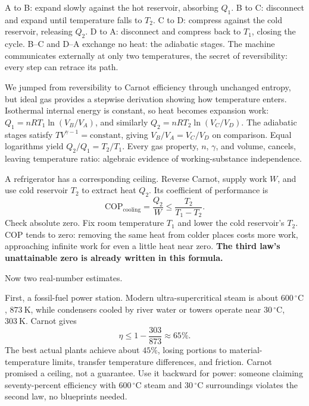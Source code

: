 A to B: expand slowly against the hot reservoir, absorbing \(Q_1\). B to C: disconnect and expand until temperature falls to \(T_2\). C to D: compress against the cold reservoir, releasing \(Q_2\). D to A: disconnect and compress back to \(T_1\), closing the cycle. B--C and D--A exchange no heat: the adiabatic stages. The machine communicates externally at only two temperatures, the secret of reversibility: every step can retrace its path.

\begin{mathbridge}
We jumped from reversibility to Carnot efficiency through unchanged entropy, but ideal gas provides a stepwise derivation showing how temperature enters. Isothermal internal energy is constant, so heat becomes expansion work: \(Q_1=nRT_1\ln(V_B/V_A)\), and similarly \(Q_2=nRT_2\ln(V_C/V_D)\). The adiabatic stages satisfy \(T V^{\gamma-1}=\text{constant}\), giving \(V_B/V_A=V_C/V_D\) on comparison. Equal logarithms yield \(Q_2/Q_1=T_2/T_1\). Every gas property, \(n\), \(\gamma\), and volume, cancels, leaving temperature ratio: algebraic evidence of working-substance independence.

A refrigerator has a corresponding ceiling. Reverse Carnot, supply work \(W\), and use cold reservoir \(T_2\) to extract heat \(Q_2\). Its coefficient of performance is
\[
\mathrm{COP}_{\text{cooling}}=\frac{Q_2}{W}\leq\frac{T_2}{T_1-T_2}.
\]
Check absolute zero. Fix room temperature \(T_1\) and lower the cold reservoir's \(T_2\). COP tends to zero: removing the same heat from colder places costs more work, approaching infinite work for even a little heat near zero. \textbf{The third law's unattainable zero is already written in this formula.}
\end{mathbridge}

Now two real-number estimates.

First, a fossil-fuel power station. Modern ultra-supercritical steam is about \(600\,^\circ\mathrm{C}\), \(873\ \mathrm{K}\), while condensers cooled by river water or towers operate near \(30\,^\circ\mathrm{C}\), \(303\ \mathrm{K}\). Carnot gives
\[
\eta\leq 1-\frac{303}{873}\approx 65\%.
\]
The best actual plants achieve about \(45\%\), losing portions to material-temperature limits, transfer temperature differences, and friction. Carnot promised a ceiling, not a guarantee. Use it backward for power: someone claiming seventy-percent efficiency with \(600\,^\circ\mathrm{C}\) steam and \(30\,^\circ\mathrm{C}\) surroundings violates the second law, no blueprints needed.

